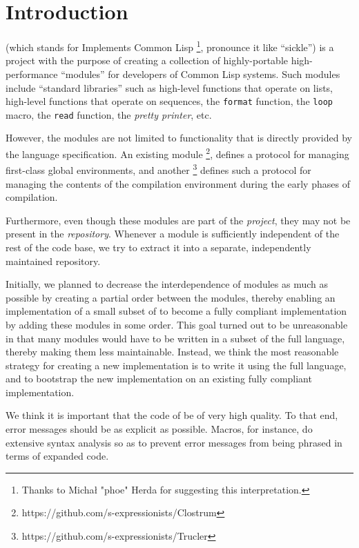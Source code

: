 
\chapter{Introduction}
%

\sysname{} (which stands for \sysname{} Implements Common Lisp%
\footnote{Thanks to Michał "phoe" Herda for suggesting this
  interpretation.}, pronounce it like ``sickle'') is a project with
the purpose of creating a collection of highly-portable
high-performance ``modules'' for developers of Common Lisp systems.
Such modules include ``standard libraries'' such as high-level
functions that operate on lists, high-level functions that operate on
sequences, the \texttt{format} function, the \texttt{loop} macro, the
\texttt{read} function, the \emph{pretty printer}, etc.

However, the modules are not limited to functionality that is directly
provided by the \commonlisp{} language specification.  An existing
module%
\footnote{https://github.com/s-expressionists/Clostrum},
defines a \clos{} protocol for managing first-class global
environments, and another%
\footnote{https://github.com/s-expressionists/Trucler}
defines such a protocol for managing
the contents of the compilation environment during the early phases of
compilation.

Furthermore, even though these modules are part of the \sysname{}
\emph{project}, they may not be present in the \sysname{}
\emph{repository}.  Whenever a module is sufficiently independent of
the rest of the \sysname{} code base, we try to extract it into a
separate, independently maintained repository.

Initially, we planned to decrease the interdependence of modules as
much as possible by creating a partial order between the modules,
thereby enabling an implementation of a small subset of \commonlisp{}
to become a fully compliant implementation by adding these modules in
some order.  This goal turned out to be unreasonable in that many
modules would have to be written in a subset of the full language,
thereby making them less maintainable.  Instead, we think the most
reasonable strategy for creating a new \commonlisp{} implementation is
to write it using the full language, and to bootstrap the new
implementation on an existing fully compliant implementation.

We think it is important that the code of
\sysname{} be of very high quality.  To that end, error messages
should be as explicit as possible.  Macros, for instance, do extensive
syntax analysis so as to prevent error messages from being phrased in
terms of expanded code.

